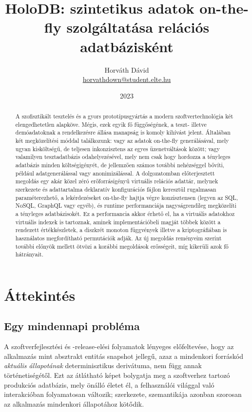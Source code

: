 \documentclass[
    parspace,
    noindent,
    nohyp,
]{elteiktdk}[2023/04/10]
\title{HoloDB: szintetikus adatok on-the-fly szolgáltatása relációs adatbázisként}
\date{2023}
\author{Horváth Dávid \\ {\small\href{mailto:horvathdown@student.elte.hu}{horvathdown@student.elte.hu}} }
\affiliation{Mesteroktató}
\begin{document}

\makecover
\cleardoublepage

\maketitle

\tableofcontents
\cleardoublepage


\begin{abstract}
A szofisztikált tesztelés és a gyors prototípusgyártás
a modern szoftvertechnológia két elengedhetetlen alapköve.
Mégis, ezek egyik fő függőségének, a teszt- illetve demóadatoknak
a rendelkezésre állása manapság is komoly kihívást jelent.
Általában két megközelítési móddal találkozunk:
vagy az adatok on-the-fly generálásával, mely ugyan kisköltségű,
de teljesen inkonzisztens az egyes üzenetváltások között;
vagy valamilyen tesztadatbázis odahelyezésével,
mely nem csak hogy hordozza a tényleges adatbázis minden költségigényét,
de jellemzően számos további nehézséggel bővíti, például adatgenerálással vagy anonimizálással.
A dolgozatomban előterjesztett megoldás egy akár közel zéró erőforrásigényű virtuális relációs adattár,
melynek szerkezete és adattartalma deklaratív
konfigurációs fájlon keresztül rugalmasan paraméterezhető,
a lekérdezéseket on-the-fly hajtja végre konzisztensen
(legyen az SQL, NoSQL, GraphQL vagy egyéb),
és runtime performanciája nagyságrendileg megközelíti a tényleges adatbázisokét.
Ez a performancia akkor érhető el, ha a virtuális adatokhoz virtuális indexek is tartoznak,
aminek implementációbeli magját többek között a rendezett értékkészletek,
a diszkrét monoton függvények
illetve a kriptográfiában is használatos megfordítható permutációk adják.
Az új megoldás reményeim szerint további előnyök mellett ötvözi a korábbi megoldások erősségeit,
míg kikerüli azok fő hátrányait.
\end{abstract}



\chapter{Áttekintés}


\section{Egy mindennapi probléma}

A szoftverfejlesztési és -release-elési folyamatok lényeges előfeltevése,
hogy az alkalmazás mint absztrakt entitás snapshot jellegű,
azaz a mindenkori forráskód \textit{aktuális állapotának} determinisztikus derivátuma,
nem függ annak történetiségétől.
Ezt az átlátható képet bolygatja meg a szoftverhez tartozó produkciós adatbázis,
mely önálló életet él, a felhasználói világgal való interakcióban folyamatosan változik;
szerkezete, szemantikája azonban szorosan az alkalmazás mindenkori állapotához kötődik.
\end{document}
